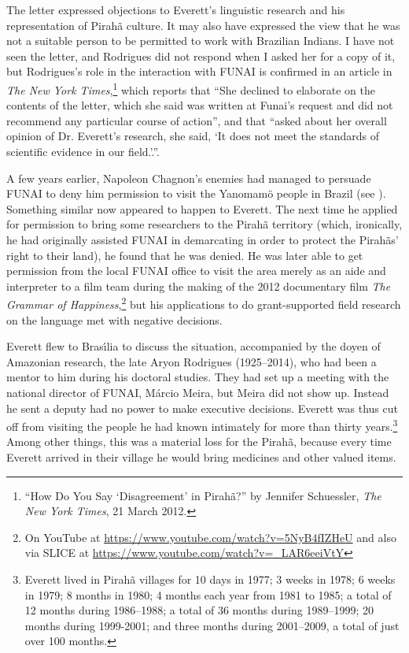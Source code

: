 \documentclass[output=paper,colorlinks,citecolor=brown
]{langscibook}
\begin{document}
The letter expressed objections to Everett's linguistic research
and his representation of Pirah{\~a} culture.  It may also have
expressed the view that he was not a suitable person to be permitted
to work with Brazilian Indians. I have not seen the letter, and
Rodrigues did not respond when I asked her for a copy of it, but
Rodrigues's role in the interaction with FUNAI is confirmed in an
article in \textit{The New York Times},\footnote{\label{schuessler}%
   ``How Do You Say `Disagreement' in Pirah{\~a}?'' by Jennifer
   Schuessler, \textit{The New York Times}, 21 March 2012.}
which reports that ``She declined to elaborate on the contents of the
letter, which she said was written at Funai's request and did not
recommend any particular course of action'', and that ``asked about
her overall opinion of Dr. Everett’s research, she said, `It does not
meet the standards of scientific evidence in our field.'.''.

A few years earlier, Napoleon Chagnon's enemies had managed to persuade
FUNAI to deny him permission to visit the Yanomam{\"o} people in Brazil
(see \citealt{Dreger11}).
Something similar now appeared to happen to Everett. The next time he
applied for permission to bring some researchers to the Pirah{\~a}
territory (which, ironically, he had originally assisted FUNAI in
demarcating in order to protect the Pirah{\~a}s' right to their
land), he found that he was denied. He was later able to get permission
from the local FUNAI office to visit the area merely as an aide and
interpreter to a film team during the making of the 2012 documentary
film \textit{The Grammar of Happiness},\footnote{\label{happiness}%
   On YouTube at \url{https://www.youtube.com/watch?v=5NyB4fIZHeU} and
   also via SLICE at \url{https://www.youtube.com/watch?v=_LAR6eeiVtY}}
but his applications to do grant-supported field research on the language
met with negative decisions.

Everett flew to Bras{\'\i}lia to discuss the situation, accompanied by
the doyen of Amazonian research, the late Aryon Rodrigues (1925--2014),
who had been a mentor to him during his doctoral studies. They had set
up a meeting with the national director of FUNAI, M{\'a}rcio Meira, but
Meira did not show up. Instead he sent a deputy had no power to make
executive decisions. Everett was thus cut off from visiting the people
he had known intimately for more than thirty
years.\footnote{\label{residence}%
   Everett lived in Pirah{\~a} villages for 10 days in 1977; 3 weeks
   in 1978; 6 weeks in 1979; 8 months in 1980; 4 months each year
   from 1981 to 1985; a total of 12 months during 1986--1988; a total
   of 36 months during 1989--1999; 20 months during 1999-2001; and
   three months during 2001--2009, a total of just over 100 months.}
Among other things, this was a material loss for the Pirah{\~a},
because every time Everett arrived in their village he would bring
medicines and other valued items.
\end{document}
